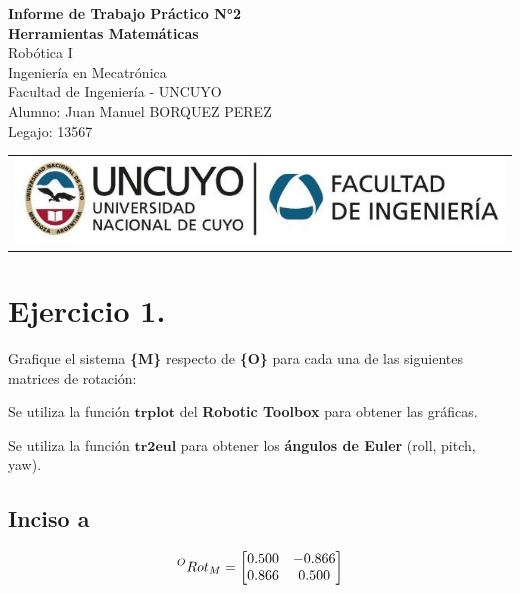 \documentclass[a4paper,12pt]{article}
\begin{document}
\begin{titlepage}
    \centering
    \vspace*{5cm}
    {\Huge\bfseries Informe de Trabajo Práctico N°2}\\
    \vspace{0.2cm}
    {\Large \textbf{Herramientas Matemáticas}}\\
    \vspace{0.5cm}
    {\Large Robótica I}\\
    \vspace{0.5 cm}
    {\Large Ingeniería en Mecatrónica}\\
    \vspace{0.2 cm}
    {\Large Facultad de Ingeniería - UNCUYO}\\
    \vspace{1.5cm}
    Alumno: Juan Manuel BORQUEZ PEREZ\\
    Legajo: 13567\\
    \vfill
    {\begin{tabular}{@{}c@{}}\includegraphics[scale=0.4]{escudo.PNG}\end{tabular}}\hspace{10pt}
\end{titlepage}

\section{Ejercicio 1.}
Grafique el sistema \textbf{\{M\}} respecto de \textbf{\{O\}} para cada una de las siguientes matrices
de rotación:

Se utiliza la función $\mathbf{trplot}$ del \textbf{Robotic Toolbox} para obtener las gráficas.

Se utiliza la función $\mathbf{tr2eul}$ para obtener los \textbf{ángulos de Euler} (roll, pitch, yaw).

\subsection{Inciso a}
\begin{equation*}
    \prescript{O}{}{Rot_M} = 
    \begin{bmatrix}
        0.500 & -0.866\\
        0.866 & 0.500
    \end{bmatrix}
\end{equation*}
\end{document}
